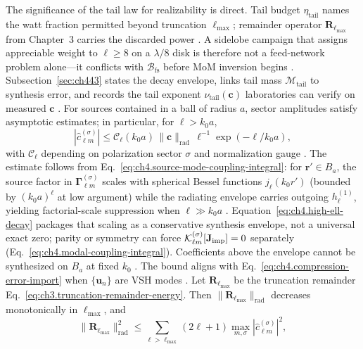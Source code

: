 The significance of the tail law for realizability is direct. Tail budget $\eta_{\mathrm{tail}}$ names the watt fraction permitted beyond truncation $\ell_{\max}$; remainder operator $\mathbf{R}_{\ell_{\max}}$ from Chapter~3 carries the discarded power \cite{stratton1941}. A sidelobe campaign that assigns appreciable weight to $\ell\ge 8$ on a $\lambda/8$ disk is therefore not a feed-network problem alone---it conflicts with $\mathcal{B}_{\mathrm{fs}}$ before MoM inversion begins \cite{chu1948}. Subsection~\ref{sec:ch443} states the decay envelope, links tail mass $\mathcal{M}_{\mathrm{tail}}$ to synthesis error, and records the tail exponent $\nu_{\mathrm{tail}}(\mathbf{c})$ laboratories can verify on measured $\mathbf{c}$ \cite{hansen1988}.
For sources contained in a ball of radius $a$, sector amplitudes satisfy asymptotic estimates; in particular, for \(\ell>k_{0}a\),
\begin{equation}
\label{eq:ch4.high-ell-decay}
|\widehat{c}_{\ell m}^{(\sigma)}|
\le
\mathcal{C}_{\ell}(k_{0}a)\,\|\mathbf{c}\|_{\mathrm{rad}}\,
\ell^{-1}\exp(-\ell/k_{0}a),
\end{equation}
with \(\mathcal{C}_{\ell}\) depending on polarization sector \(\sigma\) and normalization gauge
\cite{stratton1941}. The estimate follows from Eq.~\eqref{eq:ch4.source-mode-coupling-integral}: for $\mathbf{r}'\in B_a$, the source factor in $\boldsymbol{\Gamma}_{\ell m}^{(\sigma)}$ scales with spherical Bessel functions $j_\ell(k_0 r')$ (bounded by $(k_0 a)^\ell$ at low argument) while the radiating envelope carries outgoing $h_\ell^{(1)}$, yielding factorial-scale suppression when $\ell\gg k_0 a$ \cite{jackson1999,stratton1941}. Equation~\eqref{eq:ch4.high-ell-decay} packages that scaling as a conservative synthesis envelope, not a universal exact zero; parity or symmetry can force $\mathcal{K}_{\ell m}^{(\sigma)}[\mathbf{J}_{\mathrm{imp}}]=0$ separately (Eq.~\eqref{eq:ch4.modal-coupling-integral}). Coefficients above the envelope cannot be synthesized on
\(B_{a}\) at fixed \(k_{0}\) \cite{harrington2001}. The bound aligns with
Eq.~\eqref{eq:ch4.compression-error-import} when \(\{\mathbf{u}_{n}\}\) are VSH modes
\cite{hansen1988}.
\label{prop:ch4.ell-tail-monotone}
Let \(\mathbf{R}_{\ell_{\max}}\) be the truncation remainder Eq.~\eqref{eq:ch3.truncation-remainder-energy}. Then
\(\|\mathbf{R}_{\ell_{\max}}\|_{\mathrm{rad}}\) decreases monotonically in \(\ell_{\max}\), and
\begin{equation}
\label{eq:ch4.ellmax-tail-link}
\|\mathbf{R}_{\ell_{\max}}\|_{\mathrm{rad}}^{2}
\le
\sum_{\ell>\ell_{\max}}(2\ell+1)\max_{m,\sigma}|\widehat{c}_{\ell m}^{(\sigma)}|^{2},
\end{equation}
